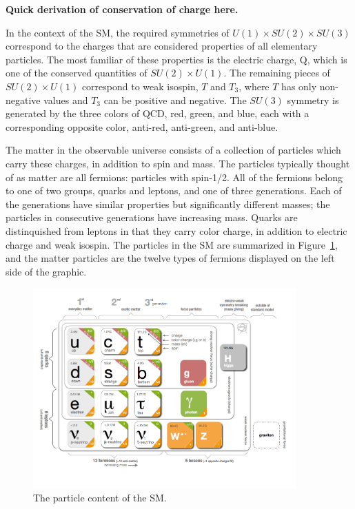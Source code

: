 \textbf{Quick derivation of conservation of charge here.}

In the context of the \ac{SM}, the required symmetries of $U(1)\times SU(2) \times SU(3)$ correspond to the charges that are considered properties of all elementary particles.
The most familiar of these properties is the electric charge, Q, which is one of the conserved quantities of $SU(2)\times U(1)$.
The remaining pieces of $SU(2)\times U(1)$ correspond to weak isospin, $T$ and $T_3$, where $T$ has only non-negative values and $T_3$ can be positive and negative.
The $SU(3)$ symmetry is generated by the three colors of \ac{QCD}, red, green, and blue, each with a corresponding opposite color, anti-red, anti-green, and anti-blue.

The matter in the observable universe consists of a collection of particles which carry these charges, in addition to spin and mass.
The particles typically thought of as matter are all fermions: particles with spin-1/2.
All of the fermions belong to one of two groups, quarks and leptons, and one of three generations.
Each of the generations have similar properties but significantly different masses; the particles in consecutive generations have increasing mass.
Quarks are distinquished from leptons in that they carry color charge, in addition to  electric charge and weak isospin.
The particles in the \ac{SM} are summarized in Figure~\ref{fig:particle_content}, and the matter particles are the twelve types of fermions displayed on the left side of the graphic.

\begin{figure}[h]
  \centering
  \includegraphics[width=0.9\textwidth]{figures/particle_content.png}
  \caption{The particle content of the \ac{SM}.}
  \label{fig:particle_content}
\end{figure}


